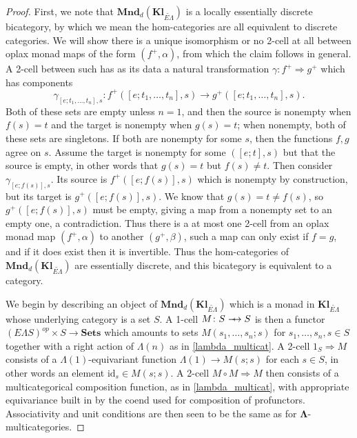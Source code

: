 \documentclass{amsbook} %
\newcommand{\mb}{\mathbf}
\newcommand{\id}{\textrm{id}}
\def\srarrow{\relbar\joinrel\mapstochar\joinrel\rightarrow}
\numberwithin{section}{chapter}
\begin{document}
\begin{proof}
First, we note that $\mb{Mnd}_{d}(\mb{Kl}_{\widetilde{E\Lambda}})$ is a locally essentially discrete bicategory, by which we mean the hom-categories are all equivalent to discrete categories.  We will show there is a unique isomorphism or no 2-cell at all between oplax monad maps of the form $(f^{+}, \alpha)$, from which the claim follows in general.  A 2-cell between such has as its data a natural transformation $\gamma \colon f^{+} \Rightarrow g^{+}$ which has components
  \[
    \gamma_{[e; t_1, \ldots, t_n], s} \colon f^{+}([e; t_1, \ldots, t_n], s) \rightarrow g^{+}([e; t_1, \ldots, t_n], s).
  \]
Both of these sets are empty unless $n=1$, and then the source is nonempty when $f(s) = t$ and the target is nonempty when $g(s)=t$; when nonempty, both of these sets are singletons.  If both are nonempty for some $s$, then the functions $f,g$ agree on $s$.  Assume the target is nonempty for some $([e;t], s)$ but that the source is empty, in other words that $g(s)=t$ but $f(s) \neq t$.  Then consider $\gamma_{[e;f(s)], s}$.  Its source is $f^{+}([e;f(s)], s)$ which is nonempty by construction, but its target is $g^{+}([e;f(s)], s)$.  We know that $g(s) = t \neq f(s)$, so $g^{+}([e;f(s)], s)$ must be empty, giving a map from a nonempty set to an empty one, a contradiction.  Thus there is a at most one 2-cell from an oplax monad map $(f^{+}, \alpha)$ to another $(g^{+}, \beta)$, such a map can only exist if $f = g$, and if it does exist then it is invertible.  Thus the hom-categories of $\mb{Mnd}_{d}(\mb{Kl}_{\widetilde{E\Lambda}})$ are essentially discrete, and this bicategory is equivalent to a category.

We begin by describing an object of $\mb{Mnd}_{d}(\mb{Kl}_{\widetilde{E\Lambda}})$ which is a monad in $\mb{Kl}_{\widetilde{E\Lambda}}$ whose underlying category is a set $S$.  A 1-cell $M \colon S \srarrow S$ is then a functor $(E\Lambda S)^{op} \times S \rightarrow \mb{Sets}$ which amounts to sets $M(s_1, \ldots, s_n; s)$ for $s_1, \ldots, s_n, s \in S$ together with a right action of $\Lambda(n)$ as in \ref{lambda_multicat}.  A 2-cell $1_{S} \Rightarrow M$ consists of a $\Lambda(1)$-equivariant function $\Lambda(1) \rightarrow M(s;s)$ for each $s \in S$, in other words an element $\id_{s} \in M(s;s)$.  A 2-cell $M \circ M \Rightarrow M$ then consists of a multicategorical composition function, as in \ref{lambda_multicat}, with appropriate equivariance built in by the coend used for composition of profunctors.  Associativity and unit conditions are then seen to be the same as for $\mb{\Lambda}$-multicategories.


\end{proof}
\end{document}

